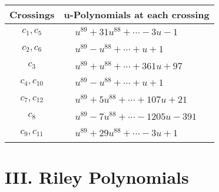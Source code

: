 \documentclass[1p]{elsarticle_modified}
\theoremstyle{definition}
\begin{document}
\begin{tabular}{m{50pt}|m{274pt}}
Crossings & \hspace{64pt}u-Polynomials at each crossing \\
\hline $$\begin{aligned}c_{1},c_{5}\end{aligned}$$&$\begin{aligned}
&u^{89}+31 u^{88}+\cdots-3 u-1
\end{aligned}$\\
\hline $$\begin{aligned}c_{2},c_{6}\end{aligned}$$&$\begin{aligned}
&u^{89}- u^{88}+\cdots+u+1
\end{aligned}$\\
\hline $$\begin{aligned}c_{3}\end{aligned}$$&$\begin{aligned}
&u^{89}+u^{88}+\cdots+361 u+97
\end{aligned}$\\
\hline $$\begin{aligned}c_{4},c_{10}\end{aligned}$$&$\begin{aligned}
&u^{89}- u^{88}+\cdots+u+1
\end{aligned}$\\
\hline $$\begin{aligned}c_{7},c_{12}\end{aligned}$$&$\begin{aligned}
&u^{89}+5 u^{88}+\cdots+107 u+21
\end{aligned}$\\
\hline $$\begin{aligned}c_{8}\end{aligned}$$&$\begin{aligned}
&u^{89}-7 u^{88}+\cdots-1205 u-391
\end{aligned}$\\
\hline $$\begin{aligned}c_{9},c_{11}\end{aligned}$$&$\begin{aligned}
&u^{89}+29 u^{88}+\cdots-3 u+1
\end{aligned}$\\
\hline
\end{tabular}\newpage\renewcommand{\arraystretch}{1}
\centering \section*{ III. Riley Polynomials}
\end{document}
